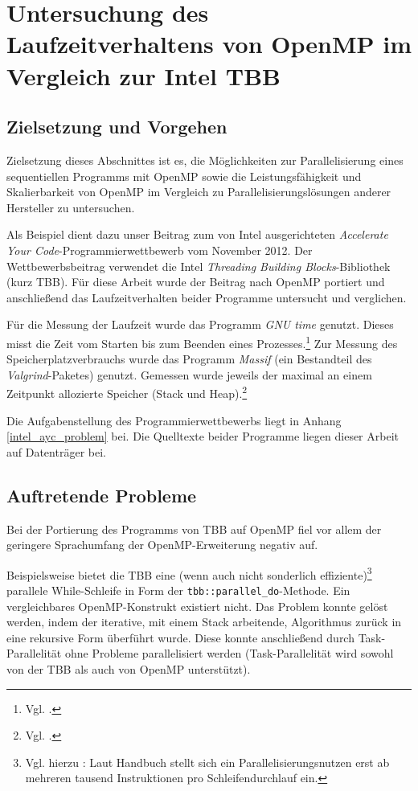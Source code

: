 \documentclass[11pt]{scrartcl}
\begin{document}
\pagebreak %

\section{Untersuchung des Laufzeitverhaltens von OpenMP im Vergleich zur Intel TBB}

\subsection{Zielsetzung und Vorgehen}

Zielsetzung dieses Abschnittes ist es, die Möglichkeiten zur Parallelisierung eines sequentiellen Programms mit OpenMP
sowie die Leistungsfähigkeit und Skalierbarkeit von OpenMP im Vergleich zu Parallelisierungslösungen anderer Hersteller
zu untersuchen.

Als Beispiel dient dazu unser Beitrag zum von Intel ausgerichteten \emph{Accelerate Your Code}-Programmierwettbewerb vom
November 2012. Der Wettbewerbsbeitrag verwendet die Intel \emph{Threading Building Blocks}-Bibliothek (kurz TBB). Für
diese Arbeit wurde der Beitrag nach OpenMP portiert und anschließend das Laufzeitverhalten beider Programme untersucht
und verglichen.

Für die Messung der Laufzeit wurde das Programm \emph{GNU time} genutzt. Dieses misst die Zeit vom Starten bis zum Beenden eines Prozesses.\footnote{Vgl. \cite{time_man_2012}.}
Zur Messung des Speicherplatzverbrauchs wurde das Programm \emph{Massif} (ein Bestandteil des \emph{Valgrind}-Paketes) genutzt. Gemessen wurde jeweils der maximal an einem Zeitpunkt allozierte Speicher (Stack und Heap).\footnote{Vgl. \cite[S. 136ff.]{valgrind_2012}.}

Die Aufgabenstellung des Programmierwettbewerbs liegt in Anhang \ref{intel_ayc_problem} bei. Die Quelltexte beider
Programme liegen dieser Arbeit auf Datenträger bei.

\subsection{Auftretende Probleme}

Bei der Portierung des Programms von TBB auf OpenMP fiel vor allem der geringere Sprachumfang der OpenMP-Erweiterung
negativ auf.

Beispielsweise bietet die TBB eine (wenn auch nicht sonderlich effiziente)\footnote{Vgl. hierzu \cite{intel_cook_2012}:
Laut Handbuch stellt sich ein Parallelisierungsnutzen erst ab mehreren tausend Instruktionen pro Schleifendurchlauf
ein.} parallele While-Schleife in Form der \texttt{tbb::parallel\_do}-Methode. Ein vergleichbares OpenMP-Konstrukt
existiert nicht. Das Problem konnte gelöst werden, indem der iterative, mit einem Stack arbeitende, Algorithmus zurück
in eine rekursive Form überführt wurde. Diese konnte anschließend durch Task-Parallelität ohne Probleme parallelisiert
werden (Task-Parallelität wird sowohl von der TBB als auch von OpenMP unterstützt).
\end{document}
